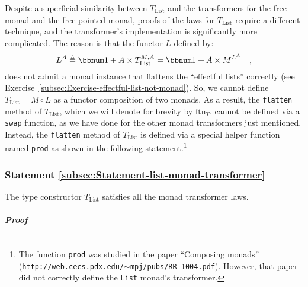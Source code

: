 Despite a superficial similarity between $T_{\text{List}}$ and the
transformers for the free monad and the free pointed monad, proofs
of the laws for $T_{\text{List}}$ require a different technique,
and the transformer\textsf{'}s implementation is significantly more complicated.
The reason is that the functor $L$ defined by:
\[
L^{A}\triangleq\bbnum 1+A\times T_{\text{List}}^{M,A}=\bbnum 1+A\times M^{L^{A}}\quad,
\]
does not admit a monad instance that flattens the \textsf{``}effectful lists\textsf{''}
correctly (see Exercise~\ref{subsec:Exercise-effectful-list-not-monad}).
So, we cannot define $T_{\text{List}}=M\circ L$ as a functor composition
of two monads. As a result, the \lstinline!flatten! method of $T_{\text{List}}$,
which we will denote for brevity by $\text{ftn}_{T}$, cannot be defined
via a \lstinline!swap! function, as we have done for the other monad
transformers just mentioned. Instead, the \lstinline!flatten! method
of $T_{\text{List}}$ is defined via a special helper function named
\lstinline!prod! as shown in the following statement.\footnote{The function \lstinline!prod! was studied in the paper \textsf{``}Composing
monads\textsf{''} (\texttt{\href{http://web.cecs.pdx.edu/~mpj/pubs/RR-1004.pdf}{http://web.cecs.pdx.edu/$\sim$mpj/pubs/RR-1004.pdf}}).
However, that paper did not correctly define the \lstinline!List!
monad\textsf{'}s transformer.}

\subsubsection{Statement \label{subsec:Statement-list-monad-transformer}\ref{subsec:Statement-list-monad-transformer}}

The type constructor $T_{\text{List}}$ satisfies all the monad transformer
laws.

\subparagraph{Proof}

